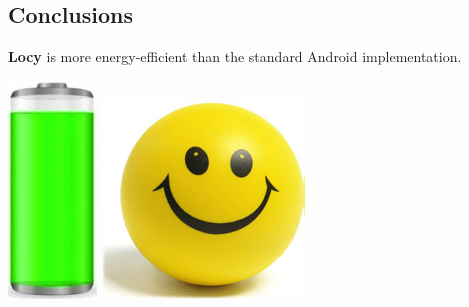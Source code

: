 \documentclass[a2,landscape]{a0poster}
\begin{document}
\begin{center}
\section*{Conclusions}
\end{center}

\textbf{Locy} is more energy-efficient than the standard Android implementation. 
\begin{center}
\includegraphics[scale=0.7]{plots/full_battery}
\includegraphics[scale=0.7]{plots/happy_face}
\end{center}
\end{document}
